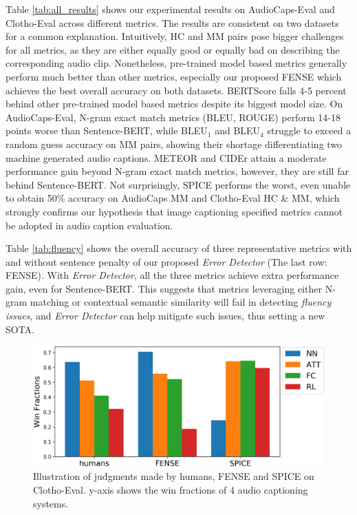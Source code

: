 \documentclass{article}
\begin{document}
Table \ref{tab:all_results} shows our experimental results on AudioCaps-Eval and Clotho-Eval across different metrics. The results are consistent on two datasets for a common explanation. Intuitively, HC and MM pairs pose bigger challenges for all metrics, as they are either equally good or equally bad on describing the corresponding audio clip. Nonetheless, pre-trained model based metrics generally perform much better than other metrics, especially our proposed FENSE which achieves the best overall accuracy on both datasets.
BERTScore falls 4-5 percent behind other pre-trained model based metrics despite its biggest model size. On AudioCaps-Eval, N-gram exact match metrics (BLEU, ROUGE) perform 14-18 points worse than Sentence-BERT, while BLEU$_1$ and BLEU$_4$ struggle to exceed a random guess accuracy on MM pairs, showing their shortage differentiating two machine generated audio captions. 
METEOR and CIDEr attain a moderate performance gain beyond N-gram exact match metrics, however, they are still far behind Sentence-BERT. 
Not surprisingly, 
SPICE performs the worst, even unable to obtain 50\% accuracy on AudioCaps MM and Clotho-Eval HC \& MM, 
which strongly confirms our hypothesis that image captioning specified metrics cannot be adopted in audio caption evaluation.

Table \ref{tab:fluency} shows the overall accuracy of three representative metrics with and without sentence penalty of our proposed \textit{Error Detector} (The last row: FENSE). With \textit{Error Detector}, all the three metrics achieve extra performance gain, even for Sentence-BERT. 
This suggests that metrics leveraging either N-gram matching or contextual semantic similarity will fail in detecting \textit{fluency issues}, and \textit{Error Detector} can help mitigate such issues, thus setting a new SOTA. 

\begin{figure}[tbp]
  \centering
  \includegraphics[width=0.95\linewidth]{fense1}
  \caption{Illustration of judgments made by humans, FENSE and SPICE on Clotho-Eval. y-axis shows the win fractions of 4 audio captioning systems. }
  \label{fig:comparison}
\end{figure}
\end{document}
